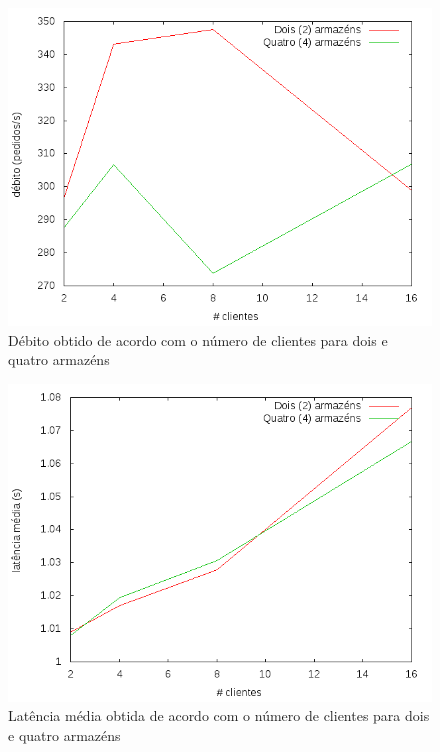 \begin{figure}[!h]
\centering
\includegraphics[scale=.5]{img/questao-1/read-uncom-deb}
\caption{Débito obtido de acordo com o número de clientes para dois e quatro armazéns}
\end{figure}

\begin{figure}[!h]
\centering
\includegraphics[scale=.5]{img/questao-1/read-uncom-lat-med}
\caption{Latência média obtida de acordo com o número de clientes para dois e quatro armazéns}
\end{figure}

